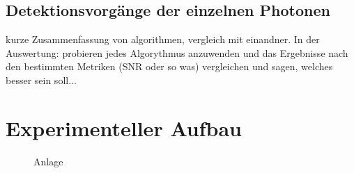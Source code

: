 \section{Detektionsvorgänge der einzelnen Photonen}
\label{text:single_photon_theorie}
kurze Zusammenfassung von algorithmen, vergleich mit einandner. In der Auswertung: probieren jedes Algorythmus anzuwenden und das Ergebnisse nach den bestimmten Metriken (SNR oder so was) vergleichen und sagen, welches besser sein soll...

\chapter{Experimenteller Aufbau}
\begin{figure}[H]
    \centering
    
    \caption{Anlage}
    \label{fig:anlage}
\end{figure}